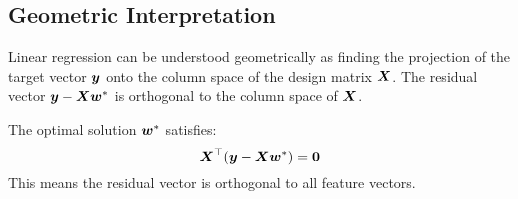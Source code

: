 \subsection{Geometric Interpretation}

Linear regression can be understood geometrically as finding the projection of the target vector $\boldsymbol{y}$ onto the column space of the design matrix $\boldsymbol{X}$. The residual vector $\boldsymbol{y} - \boldsymbol{X}\boldsymbol{w}^*$ is orthogonal to the column space of $\boldsymbol{X}$.

\begin{theorem}
The optimal solution $\boldsymbol{w}^*$ satisfies:
$$\boldsymbol{X}^\top(\boldsymbol{y} - \boldsymbol{X}\boldsymbol{w}^*) = \boldsymbol{0}$$
This means the residual vector is orthogonal to all feature vectors.
\end{theorem}

